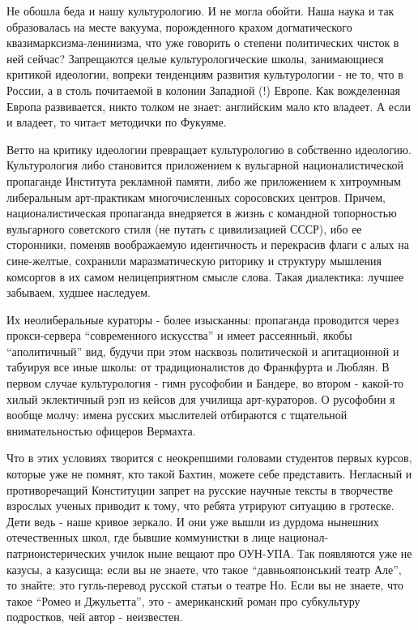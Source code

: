 Не обошла беда и нашу культурологию. И не могла обойти. Наша наука и так
образовалась на месте вакуума, порожденного крахом догматического
квазимарксизма-ленинизма, что уже говорить о степени политических чисток в ней
сейчас? Запрещаются целые культурологические школы, занимающиеся критикой
идеологии, вопреки тенденциям развития культурологии - не то, что в России, а в
столь почитаемой в колонии Западной (!) Европе. Как вожделенная Европа
развивается, никто толком не знает: английским мало кто владеет. А если и
владеет, то читаeт методички по Фукуяме.

Ветто на критику идеологии превращает культурологию в собственно идеологию.
Культурология либо становится приложением к вульгарной националистической
пропаганде Института рекламной памяти, либо же приложением к хитроумным
либеральным арт-практикам многочисленных соросовских центров. Причем,
националистическая пропаганда внедряется в жизнь с командной топорностью
вульгарного советского стиля (не путать с цивилизацией СССР), ибо ее
сторонники, поменяв воображаемую идентичность и перекрасив флаги с алых на
сине-желтые, сохранили маразматическую риторику и структуру мышления комсоргов
в их самом нелицеприятном смысле слова. Такая диалектика: лучшее забываем,
худшее наследуем. 

Их неолиберальные кураторы - более изысканны: пропаганда проводится через
прокси-сервера \enquote{современного искусства} и имеет рассеянный, якобы \enquote{аполитичный}
вид, будучи при этом насквозь политической и агитационной и табуируя все иные
школы: от традиционалистов до Франкфурта и Люблян. В первом случае
культурология - гимн русофобии и Бандере, во втором - какой-то хилый
эклектичный рэп из кейсов для училища арт-кураторов. О русофобии я вообще
молчу: имена русских мыслителей отбираются с тщательной внимательностью
офицеров Вермахта.

Что в этих условиях творится с неокрепшими головами студентов первых курсов,
которые уже не помнят, кто такой Бахтин, можете себе представить. Негласный и
противоречащий Конституции запрет на русские научные тексты в творчестве
взрослых ученых приводит к тому, что ребята утрируют ситуацию в гротеске. Дети
ведь - наше кривое зеркало. И они уже вышли из дурдома нынешних отечественных
школ, где бывшие коммунистки в лице национал-патриоистерических училок ныне
вещают про ОУН-УПА. Так появляются уже не казусы, а казусища: если вы не
знаете, что такое \enquote{давньояпонський театр Але}, то знайте: это гугль-перевод
русской статьи о театре Но. Если вы не знаете, что такое \enquote{Ромео и Джульетта},
это - американский роман про субкультуру подростков, чей автор - неизвестен. 

